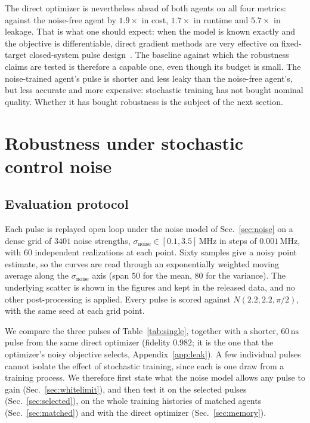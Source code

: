 \documentclass[aps,prx,twocolumn,superscriptaddress,nofootinbib,amsmath,amssymb,floatfix]{revtex4-2}
\newcommand{\Ntgt}[2]{N(#1,#1,#2)}
\newcommand{\snoise}{\sigma_{\mathrm{noise}}}
\newcommand{\ns}{\,\mathrm{ns}}
\newcommand{\MHz}{\,\mathrm{MHz}}
\begin{document}
The direct optimizer is nevertheless ahead of both agents on all four metrics: against the noise-free
agent by $1.9\times$ in cost, $1.7\times$ in runtime and $5.7\times$ in leakage. That is what one should
expect: when the model is known exactly and the objective is differentiable, direct gradient methods are
very effective on fixed-target closed-system pulse design~\cite{Khaneja2005,Koch2022}. The baseline
against which the robustness claims are tested is therefore a capable one, even though its budget is
small. The noise-trained agent's pulse is shorter and less leaky than the noise-free agent's, but less
accurate and more expensive: stochastic training has not bought nominal quality. Whether it has bought
robustness is the subject of the next section.

\section{Robustness under stochastic control noise}
\label{sec:robust}

\subsection{Evaluation protocol}

Each pulse is replayed open loop under the noise model of Sec.~\ref{sec:noise} on a dense grid of $3401$
noise strengths, $\snoise\in[0.1,3.5]\MHz$ in steps of $0.001\MHz$, with $60$ independent realizations at
each point. Sixty samples give a noisy point estimate, so the curves are read through an exponentially
weighted moving average along the $\snoise$ axis (span $50$ for the mean, $80$ for the variance). The
underlying scatter is shown in the figures and kept in the released data, and no other post-processing is
applied. Every pulse is scored against $\Ntgt{2.2}{\pi/2}$, with the same seed at each grid point.

We compare the three pulses of Table~\ref{tab:single}, together with a shorter, $60\ns$ pulse from the
same direct optimizer (fidelity $0.982$; it is the one that the optimizer's noisy objective selects,
Appendix~\ref{app:leak}). A few individual pulses cannot isolate the effect of stochastic training, since
each is one draw from a training process. We therefore first state what the noise model allows any pulse
to gain (Sec.~\ref{sec:whitelimit}), and then test it on the selected pulses (Sec.~\ref{sec:selected}), on
the whole training histories of matched agents (Sec.~\ref{sec:matched}) and with the direct optimizer
(Sec.~\ref{sec:memory}).
\end{document}
